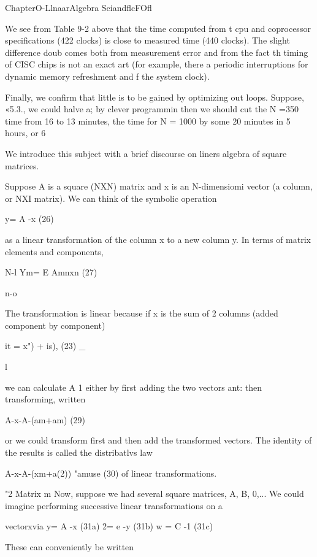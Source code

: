   
 
    
   
   
  

ChapterO-LlnaarAlgebra SciandflcFOfl

We see from Table 9-2 above that the time computed from t
cpu and coprocessor specifications (422 clocks) is close to
measured time (440 clocks). The slight difference doub
comes both from measurement error and from the fact th
timing of CISC chips is not an exact art (for example, there a
periodic interruptions for dynamic memory refreshment and f
the system clock).

Finally, we confirm that little is to be gained by optimizing out
loops. Suppose, «5.3., we could halve a; by clever programmin
then we should cut the N =350 time from 16 to 13 minutes,
the time for N = 1000 by some 20 minutes in 5 hours, or 6%

We introduce this subject with a brief discourse on liners
algebra of square matrices.

Suppose A is a square (NXN) matrix and x is an N-dimensiomi
vector (a column, or NXI matrix). We can think of the symbolic
operation

y= A -x (26)

 

as a linear transformation of the column x to a new column y. In
terms of matrix elements and components,

N-l
Ym= E Amnxn (27)

n-o

The transformation is linear because if x is the sum of 2 columns
(added component by component)

it = x") + is), (23) \_

l

we can calculate A 1 either by first adding the two vectors ant:
then transforming, written

A-x-A-(am+am) (29)

or we could transform first and then add the transformed vectors.
The identity of the results is called the distribatlvs law

A-x-A-(xm+a(2)) "amuse (30)
of linear transformations.

"2 Matrix m
Now, suppose we had several square matrices, A, B, 0,... We
could imagine performing successive linear transformations on a

vectorxvia
y= A -x (31a)
2= e -y (31b)
w = C -1 (31c)

These can conveniently be written

